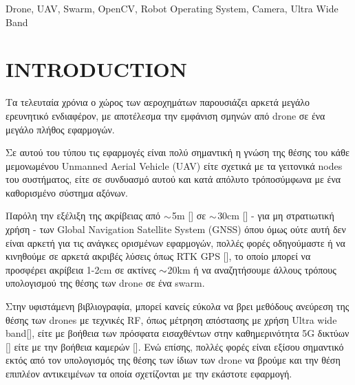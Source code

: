\begin{abstract}
Η συγκεκριμένη διπλωματική ε\-ργα\-σία έχει στόχο την επίτευξη 
υπολογισμού της θέσης - στον τρισδιάστατο χώρο - ενός πρότυπου α\-ντι\-κειμένου, 
από ένα σμήνος drone\udot με όσο δυνατόν χαμηλότερο κόστος υλικού ανά node του 
συστήματος. Ιδανικά θα γίνει προσπάθεια να γίνει multi sensor data fusion 
και να αξιοποιηθούν πληροφορίες τόσο με βάση image-based τεχνικών υπολογισμού, 
όπως επίσης και RF-based.
\end{abstract}
  
\begin{keywords}
Drone, UAV, Swarm, OpenCV, Robot Operating System, Camera, Ultra Wide Band
\end{keywords}

\section{INTRODUCTION}
Τα τελευταία χρόνια ο χώρος των αεροχημάτων παρουσιάζει αρκετά μεγάλο ερευνητικό 
ενδιαφέρον, με αποτέλεσμα την εμφάνιση σμηνών από drone σε ένα μεγάλο
πλήθος εφαρμογών. 

Σε αυτού του τύπου τις εφαρμογές είναι πολύ σημαντική η γνώση της θέσης του κάθε 
μεμονωμένου Unmanned Aerial Vehicle (UAV) είτε σχετικά με τα γειτονικά nodes του 
συστήματος, είτε σε συ\-νδυα\-σμό αυτού και κατά απόλυτο τρόπο\udot σύμφωνα με ένα 
καθορισμένο σύστημα αξόνων.

Παρόλη την εξέλιξη της ακρίβειας από $\small \sim$5m [\cite{1}] 
σε $\small \sim$30cm [\cite{2}] - για μη στρατιωτική χρήση - των 
Global Navigation Satellite System (GNSS)\udot
όπου όμως ούτε αυτή δεν είναι αρκετή για τις ανάγκες ορισμένων εφαρμογών, 
πολλές φορές οδηγούμαστε ή να κινηθούμε σε αρκετά ακριβές 
λύσεις όπως RTK GPS [\cite{3}], το οποίο μπορεί να προσφέρει ακρίβεια 1-2cm σε 
ακτίνες $\small \sim$20km ή να αναζητήσουμε άλλους τρόπους υπολογισμού της θέσης
των drone σε ένα swarm.

Στην υφιστάμενη βιβλιογραφία, μπορεί κανείς εύκολα να βρει μεθόδους ανεύρεση της θέσης  
των drones με τεχνικές RF, όπως μέτρηση απόστασης με 
χρήση Ultra wide band[\cite{4}], είτε με βοήθεια των πρόσφατα εισαχθέντων στην καθημερινότητα
5G δικτύων [\cite{5}] είτε με την βοήθεια καμερών [\cite{6}]. Ενώ επίσης, πολλές φορές είναι
εξίσου σημαντικό εκτός από τον υπολογισμός της θέσης των ίδιων των drone να βρούμε και την
θέση επιπλέον αντικειμένων τα οποία σχετίζονται με την εκάστοτε εφαρμογή.

